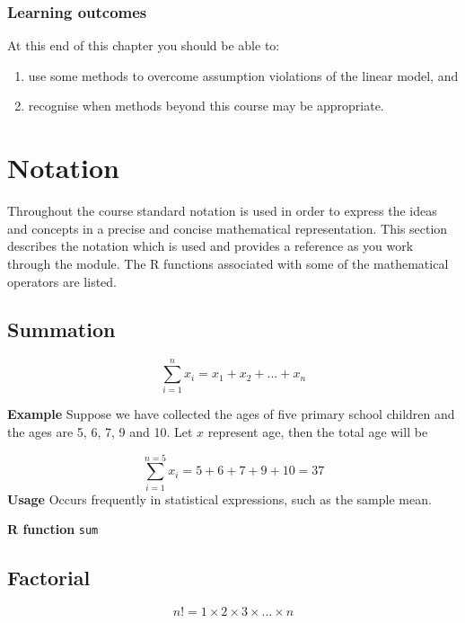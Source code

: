 \documentclass[
  oneside]{krantz}
\providecommand{\tightlist}{%
  \setlength{\itemsep}{0pt}\setlength{\parskip}{0pt}}
\begin{document}
\hypertarget{learning-outcomes-11}{%
\subsection{Learning outcomes}\label{learning-outcomes-11}}

At this end of this chapter you should be able to:

\begin{enumerate}
\def\labelenumi{\arabic{enumi}.}
\tightlist
\item
  use some methods to overcome assumption violations of the linear model, and
\item
  recognise when methods beyond this course may be appropriate.
\end{enumerate}

\hypertarget{notation}{%
\chapter{Notation}\label{notation}}

Throughout the course standard notation is used in order to express the ideas and concepts in a precise and concise mathematical representation. This section describes the notation which is used and provides a reference as you work through the module. The R functions associated with some of the mathematical operators are listed.

\hypertarget{summation}{%
\section{Summation}\label{summation}}

\[\sum_{i=1} ^{n} x_i = x_1 + x_2 + ... + x_n\]

\textbf{Example} Suppose we have collected the ages of five primary school children and the ages are 5, 6, 7, 9 and 10. Let \(x\) represent age, then the total age will be

\[ \sum_{i=1}^{n=5}x_i = 5 + 6 + 7 + 9 + 10 = 37\]
\textbf{Usage} Occurs frequently in statistical expressions, such as the sample mean.

\textbf{R function} \texttt{sum}

\hypertarget{factorial}{%
\section{Factorial}\label{factorial}}

\[n! = 1 \times 2 \times 3 \times ... \times n\]
\end{document}
